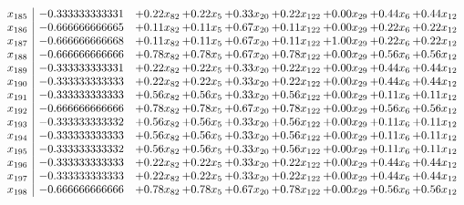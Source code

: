 \documentclass[8pt]{article}
\begin{document}
\[\begin{array}{c| c c@{\hskip 2pt} c@{\hskip 2pt} c@{\hskip 2pt} c@{\hskip 2pt} c@{\hskip 2pt} c@{\hskip 2pt} c@{\hskip 2pt} }
 x_{185}   &  -0.333333333331 & +  0.22 x_{82} & +  0.22 x_{5} & +  0.33 x_{20} & +  0.22 x_{122} & +  0.00 x_{29} & +  0.44 x_{6} & +  0.44 x_{12}\\
 x_{186}   &  -0.666666666665 & +  0.11 x_{82} & +  0.11 x_{5} & +  0.67 x_{20} & +  0.11 x_{122} & +  0.00 x_{29} & +  0.22 x_{6} & +  0.22 x_{12}\\
 x_{187}   &  -0.666666666668 & +  0.11 x_{82} & +  0.11 x_{5} & +  0.67 x_{20} & +  0.11 x_{122} & +  1.00 x_{29} & +  0.22 x_{6} & +  0.22 x_{12}\\
 x_{188}   &  -0.666666666666 & +  0.78 x_{82} & +  0.78 x_{5} & +  0.67 x_{20} & +  0.78 x_{122} & +  0.00 x_{29} & +  0.56 x_{6} & +  0.56 x_{12}\\
 x_{189}   &  -0.333333333331 & +  0.22 x_{82} & +  0.22 x_{5} & +  0.33 x_{20} & +  0.22 x_{122} & +  0.00 x_{29} & +  0.44 x_{6} & +  0.44 x_{12}\\
 x_{190}   &  -0.333333333333 & +  0.22 x_{82} & +  0.22 x_{5} & +  0.33 x_{20} & +  0.22 x_{122} & +  0.00 x_{29} & +  0.44 x_{6} & +  0.44 x_{12}\\
 x_{191}   &  -0.333333333333 & +  0.56 x_{82} & +  0.56 x_{5} & +  0.33 x_{20} & +  0.56 x_{122} & +  0.00 x_{29} & +  0.11 x_{6} & +  0.11 x_{12}\\
 x_{192}   &  -0.666666666666 & +  0.78 x_{82} & +  0.78 x_{5} & +  0.67 x_{20} & +  0.78 x_{122} & +  0.00 x_{29} & +  0.56 x_{6} & +  0.56 x_{12}\\
 x_{193}   &  -0.333333333332 & +  0.56 x_{82} & +  0.56 x_{5} & +  0.33 x_{20} & +  0.56 x_{122} & +  0.00 x_{29} & +  0.11 x_{6} & +  0.11 x_{12}\\
 x_{194}   &  -0.333333333333 & +  0.56 x_{82} & +  0.56 x_{5} & +  0.33 x_{20} & +  0.56 x_{122} & +  0.00 x_{29} & +  0.11 x_{6} & +  0.11 x_{12}\\
 x_{195}   &  -0.333333333332 & +  0.56 x_{82} & +  0.56 x_{5} & +  0.33 x_{20} & +  0.56 x_{122} & +  0.00 x_{29} & +  0.11 x_{6} & +  0.11 x_{12}\\
 x_{196}   &  -0.333333333333 & +  0.22 x_{82} & +  0.22 x_{5} & +  0.33 x_{20} & +  0.22 x_{122} & +  0.00 x_{29} & +  0.44 x_{6} & +  0.44 x_{12}\\
 x_{197}   &  -0.333333333333 & +  0.22 x_{82} & +  0.22 x_{5} & +  0.33 x_{20} & +  0.22 x_{122} & +  0.00 x_{29} & +  0.44 x_{6} & +  0.44 x_{12}\\
 x_{198}   &  -0.666666666666 & +  0.78 x_{82} & +  0.78 x_{5} & +  0.67 x_{20} & +  0.78 x_{122} & +  0.00 x_{29} & +  0.56 x_{6} & +  0.56 x_{12}\\

\end{array}\]
\end{document}
